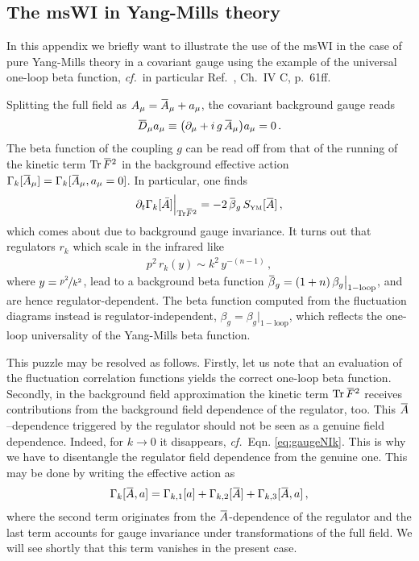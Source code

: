 \documentclass[11pt]{book}
\newcommand{\overbar}[1]{\mkern 1.5mu\overline{\mkern-1.5mu#1\mkern-1.5mu}\mkern 1.5mu}
\newcommand{\Tr}{\mathrm{Tr}}
\newcommand\cf{\textit{cf.}\ }
\numberwithin{equation}{chapter}
\begin{document}
\begin{appendices}
\chapter[Modified Ward identities in Yang-Mills theory]{The msWI in Yang-Mills theory}
\label{app:YM}

In this appendix we briefly want to illustrate
the use of the msWI in the case of
pure Yang-Mills theory in a covariant gauge
using the example of the universal one-loop beta function,
\cf in particular Ref.~\cite{PawlowskiH}, Ch.~IV C, p.~61ff.

Splitting the full field as
$A_\mu = \overbar A_\mu + a_\mu$,
the covariant background gauge reads
\begin{align}
	\overbar D_\mu a_\mu
  \equiv \big( \partial_\mu + i\,g\,\overbar A_\mu \big) a_\mu
  = 0\,.
\end{align}
The beta function of the coupling $g$ can be read off from that of the
running of the kinetic term $\Tr \,\overbar F^2$ in the background effective
action $\Gamma_k[\overbar A_\mu]=\Gamma_k[\overbar A_\mu, a_\mu=0]$.
In particular, one finds
\begin{align}
	\partial_t \Gamma_k[\bar A]\Big|_{\Tr \overbar F^2} =
  - 2 \, \overbar \beta_g \,
	S_{\mathrm{\scriptscriptstyle YM}}[\overbar A] \,,
  \label{eq:betabarA}
\end{align}
which comes about due to background gauge invariance.
It turns out that regulators $r_k$ which scale in the infrared like
\begin{align}
	p^2 \, r_k(y)
  \sim
  k^2 \, y^{-(n-1)}\,,
  \label{eq:IRRk}
\end{align}
where $y = \nicefrac{p^2}{k^2}$,
lead to a background beta function
$\overbar \beta_g = (1+n) \, \beta_g \big|_{\mathrm{1-loop}}$,
and are hence regulator-dependent.
The beta function computed from the fluctuation diagrams instead is
regulator-independent,
$\beta_g = \beta_g \big|_{\mathrm{1-loop}}$,
which reflects the one-loop universality of the Yang-Mills beta function.

This puzzle may be resolved as follows.
Firstly, let us note that an evaluation of the fluctuation correlation functions
yields the correct one-loop beta function.
Secondly, in the background field approximation the kinetic term $\Tr\,\overbar F^2$ receives
contributions from the background field dependence of the regulator, too.
This $\overbar A$--dependence triggered by the regulator should not be seen
as a genuine field dependence. Indeed, for $k\to 0$ it disappears, \cf Eqn.
\eqref{eq:gaugeNIk}. This is why we have to disentangle the regulator field
dependence from the genuine one.
This may be done by writing the effective action as
\begin{align}
  \Gamma_k[\overbar A,a] = \Gamma_{k,1}[a] + \Gamma_{k,2}[\overbar A] + \Gamma_{k,3}[\overbar A, a]\,,
  \label{eq:EAsplit}
\end{align}
where the second term originates from the $\overbar A$-dependence of the regulator and
the last term accounts for gauge invariance under transformations of the full field.
We will see shortly that this term vanishes in the present case.


\end{appendices}
\end{document}
